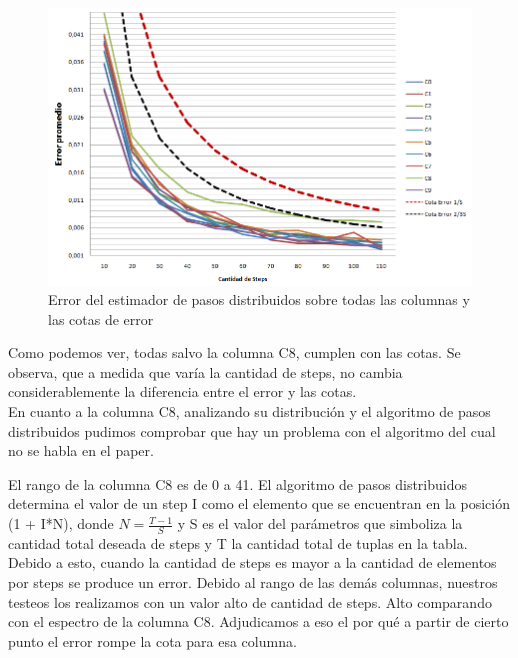 \begin{figure}[H]
	  \begin{center}
	    \includegraphics[scale=.70]{imagenes/StepsCotasDeError.png}
	    \caption{Error del estimador de pasos distribuidos sobre todas las columnas y las cotas de error} 
	    \label{fig:(StepsErrorCota}
	  \end{center}
	\end{figure}
	
\quad Como podemos ver, todas salvo la columna C8, cumplen con las cotas. Se observa, que a medida que var\'ia la cantidad de steps, no cambia considerablemente la diferencia entre el error y las cotas. \\

\quad En cuanto a la columna C8, analizando su distribuci\'on y el algoritmo de pasos distribuidos pudimos comprobar que hay un problema con el algoritmo del cual no se habla en el paper.

\quad El rango de la columna C8 es de 0 a 41. El algoritmo de pasos distribuidos determina el valor de un step I como el elemento que se encuentran en la posici\'on (1 + I*N), donde $ N = \frac{T-1}{S} $ y S es el valor del par\'ametros que simboliza la cantidad total deseada de steps y T la cantidad total de tuplas en la tabla. Debido a esto, cuando la cantidad de steps es mayor a la cantidad de elementos por steps se produce un error. Debido al rango de las dem\'as columnas, nuestros testeos los realizamos con un valor alto de cantidad de steps. Alto comparando con el espectro de la columna C8. Adjudicamos a eso el por qu\'e a partir de cierto punto el error rompe la cota para esa columna. 